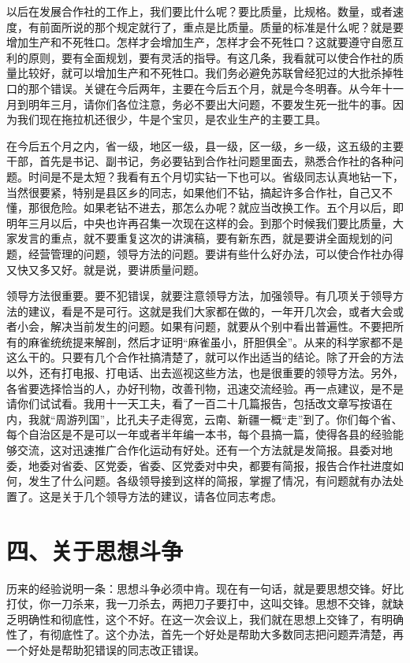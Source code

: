 以后在发展合作社的工作上，我们要比什么呢？要比质量，比规格。数量，或者速度，有前面所说的那个规定就行了，重点是比质量。质量的标准是什么呢？就是要增加生产和不死牲口。怎样才会增加生产，怎样才会不死牲口？这就要遵守自愿互利的原则，要有全面规划，要有灵活的指导。有这几条，我看就可以使合作社的质量比较好，就可以增加生产和不死牲口。我们务必避免苏联曾经犯过的大批杀掉牲口的那个错误。关键在今后两年，主要在今后五个月，就是今冬明春。从今年十一月到明年三月，请你们各位注意，务必不要出大问题，不要发生死一批牛的事。因为我们现在拖拉机还很少，牛是个宝贝，是农业生产的主要工具。

在今后五个月之内，省一级，地区一级，县一级，区一级，乡一级，这五级的主要干部，首先是书记、副书记，务必要钻到合作社问题里面去，熟悉合作社的各种问题。时间是不是太短？我看有五个月切实钻一下也可以。省级同志认真地钻一下，当然很要紧，特别是县区乡的同志，如果他们不钻，搞起许多合作社，自己又不懂，那很危险。如果老钻不进去，那怎么办呢？就应当改换工作。五个月以后，即明年三月以后，中央也许再召集一次现在这样的会。到那个时候我们要比质量，大家发言的重点，就不要重复这次的讲演稿，要有新东西，就是要讲全面规划的问题，经营管理的问题，领导方法的问题。要讲有些什么好办法，可以使合作社办得又快又多又好。就是说，要讲质量问题。

领导方法很重要。要不犯错误，就要注意领导方法，加强领导。有几项关于领导方法的建议，看是不是可行。这就是我们大家都在做的，一年开几次会，或者大会或者小会，解决当前发生的问题。如果有问题，就要从个别中看出普遍性。不要把所有的麻雀统统提来解剖，然后才证明“麻雀虽小，肝胆俱全”。从来的科学家都不是这么干的。只要有几个合作社搞清楚了，就可以作出适当的结论。除了开会的方法以外，还有打电报、打电话、出去巡视这些方法，也是很重要的领导方法。另外，各省要选择恰当的人，办好刊物，改善刊物，迅速交流经验。再一点建议，是不是请你们试试看。我用十一天工夫，看了一百二十几篇报告，包括改文章写按语在内，我就“周游列国”，比孔夫子走得宽，云南、新疆一概“走”到了。你们每个省、每个自治区是不是可以一年或者半年编一本书，每个县搞一篇，使得各县的经验能够交流，这对迅速推广合作化运动有好处。还有一个方法就是发简报。县委对地委，地委对省委、区党委，省委、区党委对中央，都要有简报，报告合作社进度如何，发生了什么问题。各级领导接到这样的简报，掌握了情况，有问题就有办法处置了。这是关于几个领导方法的建议，请各位同志考虑。

\section{四、关于思想斗争}

历来的经验说明一条：思想斗争必须中肯。现在有一句话，就是要思想交锋。好比打仗，你一刀杀来，我一刀杀去，两把刀子要打中，这叫交锋。思想不交锋，就缺乏明确性和彻底性，这个不好。在这一次会议上，我们就在思想上交锋了，有明确性了，有彻底性了。这个办法，首先一个好处是帮助大多数同志把问题弄清楚，再一个好处是帮助犯错误的同志改正错误。

